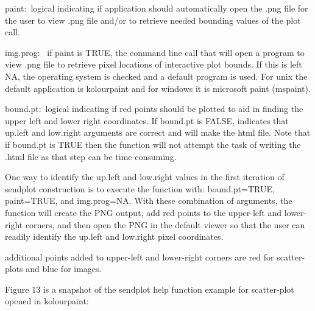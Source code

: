 \documentclass[]{article}
\begin{document}
\begin{description}
 \item{paint:~}{logical indicating if application should
    automatically open the .png file for the user to view .png file and/or
    to retrieve needed bounding values of the plot call.}

  \item{img.prog:~ }{if paint is TRUE, the command line call that will open
    a program to view .png file to retrieve pixel locations of interactive
    plot bounds. If this is left NA, the operating system is checked and
    a default program is used. For unix the default application is
    kolourpaint and for windows it is microsoft paint (mspaint).}

  \item{bound.pt:~}{logical indicating if red points should be plotted to
    aid in finding the upper left and lower right coordinates. If
    bound.pt is FALSE, indicates that up.left and low.right arguments
    are correct and will make the html file. Note that if bound.pt is TRUE then the function will not
    attempt the task of writing the .html file as that step can be time consuming.}

 \end{description}
One way to identify the up.left and low.right values in the first iteration of sendplot construction is to execute the function with: bound.pt=TRUE, paint=TRUE, and img.prog=NA. With these combination of arguments, the function will create the PNG output, add red points to the upper-left and lower-right corners, and then open the PNG in the default viewer so that the user can readily identify the up.left and low.right pixel coordinates. 

 additional points added to upper-left and lower-right corners are red for scatter-plots and blue for 
images. \newline

 \indent Figure 13 is a snapshot of the sendplot help function example for scatter-plot opened in kolourpaint:
\end{document}
